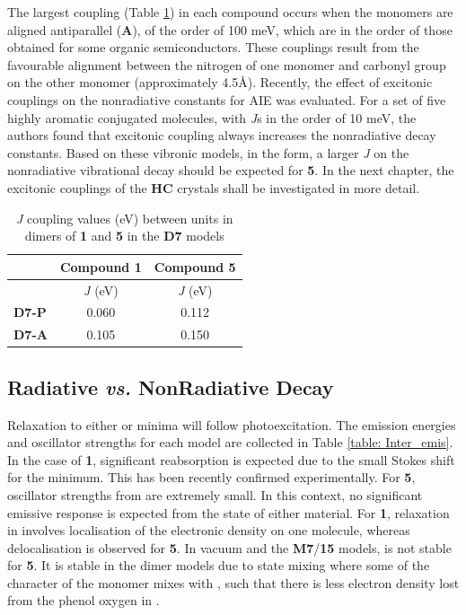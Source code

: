 The largest coupling (Table \ref{table: Inter_Jcoupling}) in each compound occurs when the monomers are aligned antiparallel (\textbf{A}), of the order of 100 meV, which are in the order of those obtained for some organic semiconductors.\cite{Fornari2017} These couplings result from the favourable alignment between the nitrogen of one monomer and carbonyl group on the other monomer (approximately 4.5{\AA}). Recently, the effect of excitonic couplings on the nonradiative constants for AIE was evaluated.\citep{Li2017} For a set of five highly aromatic conjugated molecules, with \textit{J}s in the order of 10 meV, the authors found that excitonic coupling always increases the nonradiative decay constants. Based on these vibronic models, in the \Estar{} form, a larger \textit{J} on the nonradiative vibrational decay should be expected for \textbf{5}. In the next chapter, the excitonic couplings of the \textbf{HC} crystals shall be investigated in more detail.
\begin{table}
\centering
\caption[Exciton coupling in dimers of \textbf{HC1} \& \textbf{5}]{\textit{J} coupling values (eV) between units in dimers of \textbf{1} and \textbf{5} in the \textbf{D7} models}
\label{table: Inter_Jcoupling}
  \begin{tabular}{lcc}
    \hline
     & 
     {Compound \textbf{1}} &
     {Compound \textbf{5}}\\
    \hline
     & \textit{J} (eV)& 
    \textit{J} (eV)\\
    \hline
    {\textbf{D7-P}} &

    0.060 & 0.112\\
    {\textbf{D7-A}}
    & 0.105&0.150\\
    \hline
\end{tabular}
\end{table} 
\subsection{Radiative \textit{vs.} NonRadiative Decay}\label{section: Inter_Relaxation}
Relaxation to either \Estar{} or \Kstar{} minima will follow photoexcitation. The emission energies and oscillator strengths for each model are collected in Table \ref{table: Inter_emis}. In the case of \textbf{1}, significant reabsorption is expected due to the small Stokes shift for the \Estar{} minimum. This has been recently confirmed experimentally.\cite{Zahid2017} For \textbf{5}, oscillator strengths from \Estar{} are extremely small. In this context, no significant emissive response is expected from the \Estar{} state of either material. For \textbf{1}, relaxation in \Estar{} involves localisation of the electronic density on one molecule, whereas delocalisation is observed for \textbf{5}. In vacuum and the \textbf{M7}/\textbf{15} models, \Estar{} is not stable for \textbf{5}. It is stable in the dimer models due to state mixing where some of the \stwo{} character of the monomer mixes with \sone{}, such that there is less electron density lost from the phenol oxygen in \sone{}. 

